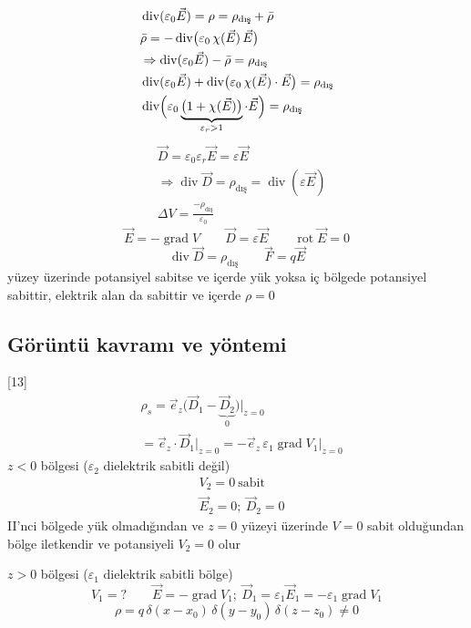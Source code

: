 \documentclass[11pt,a4paper]{article}
\begin{document}
\begin{align*}
&\operatorname{div}(\varepsilon_0\vec E)=\rho=\rho_{\text{dış}}+\bar\rho\\
&\bar\rho=-\operatorname{div}\bigl(\varepsilon_0\,\chi(\vec E)\,\vec E\bigr)\\
&\Rightarrow\operatorname{div}(\varepsilon_0\vec E)-\bar\rho=\rho_{\text{dış}}\\
&\operatorname{div}(\varepsilon_0\vec E)+\operatorname{div}\bigl(\varepsilon_0\,\chi(\vec E)\cdot\vec E\bigr)=\rho_{\text{dış}}\\
&\operatorname{div}\Bigl(\varepsilon_0\underbrace{\bigl(1+\chi(\vec E)\bigr)}_{\varepsilon_r>1}\cdot\vec E\Bigr)=\rho_{\text{dış}}
\end{align*}
\begin{align*}
&\vec D=\varepsilon_0\varepsilon_r\vec E=\varepsilon\vec E\\
&\Rightarrow\operatorname{div}\vec D=\rho_{\text{dış}}=\operatorname{div}(\varepsilon\vec E)\\
&\Delta V=\frac{-\rho_{\text{dış}}}{\varepsilon_0}
\end{align*}
\[ \vec E=-\operatorname{grad}V\qquad \vec D=\varepsilon\vec E\qquad \operatorname{rot}\vec E=0 \]
\[ \operatorname{div}\vec D=\rho_{\text{dış}}\qquad \vec F=q\vec E \]
yüzey üzerinde potansiyel sabitse ve içerde yük yoksa iç bölgede potansiyel sabittir, elektrik alan da sabittir ve içerde $\rho=0$
\subsection*{Görüntü kavramı ve yöntemi}
[13]
\begin{align*}
&\rho_s=\vec e_z\bigl(\vec D_1-\underbrace{\vec D_2}_{0}\bigr)\Big|_{z=0}\\
&=\vec e_z\cdot\vec D_1\Big|_{z=0}=-\vec e_z\,\varepsilon_1\operatorname{grad}V_1\Big|_{z=0}
\end{align*}
$z<0$ bölgesi ($\varepsilon_2$ dielektrik sabitli değil)
\begin{align*}
&V_2=0\ \text{sabit}\\
&\vec E_2=0;\ \vec D_2=0
\end{align*}
II'nci bölgede yük olmadığından ve $z=0$ yüzeyi üzerinde $V=0$ sabit olduğundan bölge iletkendir ve potansiyeli $V_2=0$ olur

$z>0$ bölgesi ($\varepsilon_1$ dielektrik sabitli bölge)
\[ V_1=?\qquad \vec E=-\operatorname{grad}V_1;\ \vec D_1=\varepsilon_1\vec E_1=-\varepsilon_1\operatorname{grad}V_1 \]
\[ \rho=q\,\delta(x-x_0)\,\delta(y-y_0)\,\delta(z-z_0)\neq0 \]
\end{document}
